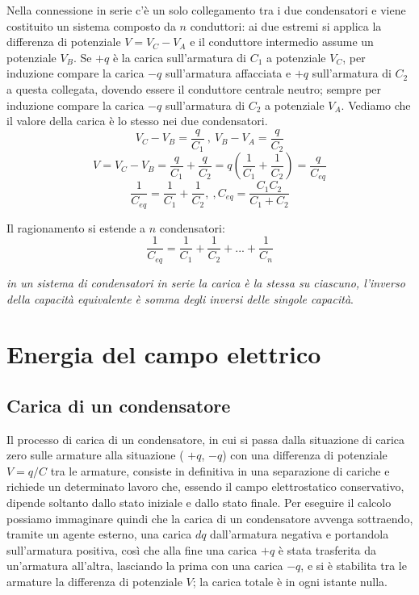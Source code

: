 \documentclass[class=book, crop=false, oneside, 12pt]{standalone}
\begin{document}
Nella connessione in serie c'è un solo collegamento tra i due condensatori e viene costituito un sistema composto da \(n\) conduttori: ai due estremi si applica la differenza di potenziale \(V = V_C-V_A\) e il conduttore intermedio assume un potenziale \(V_B\).
Se \(+q\) è la carica sull'armatura di \(C_1\) a potenziale \(V_C\), per induzione compare la carica \(-q\) sull'armatura affacciata e \(+q\) sull'armatura di \(C_2\) a questa collegata, dovendo essere il conduttore centrale neutro; sempre per induzione compare la carica \(-q\) sull'armatura di \(C_2\) a potenziale \(V_A\). 
Vediamo che il valore della carica è lo stesso nei due condensatori. 
\begin{equation*}
    V_C -V_B = \frac{q}{C_1} \ , \ V_B - V_A = \frac{q}{C_2}
\end{equation*}
\begin{equation*}
    V = V_C -V_B = \frac{q}{C_1} + \frac{q}{C_2} = q \left(\frac{1}{C_1} + \frac{1}{C_2}\right) = \frac{q}{C_{eq}}
\end{equation*}
\begin{equation*}
    \frac{1}{C_{eq}} = \frac{1}{C_1} + \frac{1}{C_2} , \ , C_{eq} = \frac{C_1 C_2}{C_1 + C_2}
\end{equation*}

Il ragionamento si estende a \(n\) condensatori:
\begin{equation}
    \frac{1}{C_{eq}} =  \frac{1}{C_{1}} +  \frac{1}{C_{2}} + ... +  \frac{1}{C_n}
\end{equation}

\emph{in un sistema di condensatori in serie la carica è la stessa su ciascuno, l'inverso della capacità equivalente è somma degli inversi delle singole capacità}. 

\section{Energia del campo elettrico}

\subsection{Carica di un condensatore}

Il processo di carica di un condensatore, in cui si passa dalla situazione di carica zero sulle armature alla situazione ( \(+q\), \(-q\)) con una differenza di potenziale \(V =q / C\) tra le armature, consiste in definitiva in una separazione di cariche e richiede un determinato lavoro che, essendo il campo elettrostatico conservativo, dipende soltanto dallo stato iniziale e dallo stato finale.
Per eseguire il calcolo possiamo immaginare quindi che la carica di un condensatore avvenga sottraendo, tramite un agente esterno, una carica \(dq\) dall'armatura negativa e portandola sull'armatura positiva, così che alla fine una carica \(+q\) è stata trasferita da un'armatura all'altra, lasciando la prima con una carica \(-q\), e si è stabilita tra le armature la differenza di potenziale \(V\); la carica totale è in ogni istante nulla.
\end{document}
